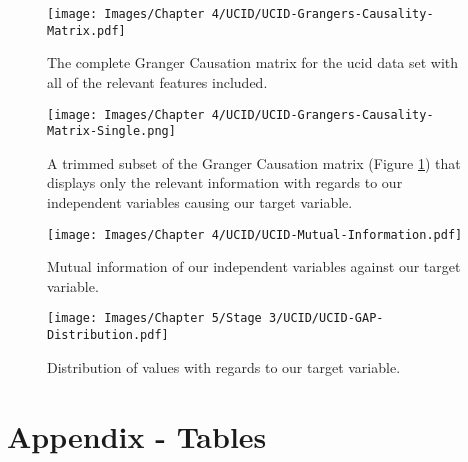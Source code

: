 \begin{figure}[hbt!]
    \centering
    \texttt{[image: Images/Chapter 4/UCID/UCID-Grangers-Causality-Matrix.pdf]}
    \caption{The complete Granger Causation matrix for the \gls{ucid} data set with all of the relevant features included.}
    \label{fig:UCID-Grangers-Causality-Matrix-All}
\end{figure}

\begin{figure}[hbt!]
    \centering
    \texttt{[image: Images/Chapter 4/UCID/UCID-Grangers-Causality-Matrix-Single.png]}
    \caption{A trimmed subset of the Granger Causation matrix (Figure \ref{fig:UCID-Grangers-Causality-Matrix-All}) that displays only the relevant information with regards to our independent variables causing our target variable.}
    \label{fig:UCID-Grangers-Causality-Matrix-Single}
\end{figure}

\begin{figure}[hbt!]
    \centering
    \texttt{[image: Images/Chapter 4/UCID/UCID-Mutual-Information.pdf]}
    \caption{Mutual information of our independent variables against our target variable.}
    \label{fig:UCID-Mutual-Information-Gain}
\end{figure}

\begin{figure}[hbt!]
    \centering
    \texttt{[image: Images/Chapter 5/Stage 3/UCID/UCID-GAP-Distribution.pdf]}
    \caption{Distribution of values with regards to our target variable.}
    \label{fig:UCID-GAP-Distribution}
\end{figure}

\chapter{Appendix - Tables}
\label{ch:Appendix:Tables}

